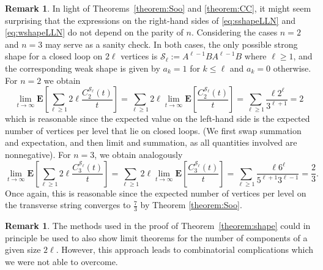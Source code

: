 \documentclass[a4paper,11pt,reqno]{amsart}
\newcommand{\paul}[1]{\todo[color=yellow!70,inline]{Paul: #1}}
\newcommand{\fabian}[1]{\todo[color=red!50,inline]{Fabian: #1}}
\newcommand{\bE}{\mathbf{E}}
\newcommand{\shape}{\mathscr{S}}
\theoremstyle{definition}
\newtheorem{remark}[lemma]{Remark}
\begin{document}
\begin{remark}
 In light of Theorems~\ref{theorem:Soo} and \ref{theorem:CC}, it might seem surprising that the expressions on the right-hand sides of \eqref{eq:sshapeLLN} and \eqref{eq:wshapeLLN} do not depend on the parity of $n$. Considering the cases $n=2$ and $n=3$ may serve as a sanity check. In both cases, the only possible strong shape for a closed loop on $2\ell$ vertices is $\shape_\ell:=A^{\ell-1}BA^{\ell-1}B$ where $\ell\geq 1$, and the corresponding weak shape is given by $a_k=1$ for $k\leq \ell$ and $a_k=0$ otherwise. For $n=2$ we obtain
 \begin{equation*}
  \lim_{t\to\infty} \bE\left[\sum_{\ell\geq1} 2\ell\frac{C_2^{\shape_\ell}(t)}{t} \right]
  = \sum_{\ell\geq1} 2\ell \lim_{t\to\infty} \bE\left[\frac{C_2^{\shape_\ell}(t)}{t} \right] 
  = \sum_{\ell\geq1} \frac{\ell 2^{\ell}}{3^{\ell+1}} = 2
 \end{equation*}
which is reasonable since the expected value on the left-hand side is the expected number of vertices per level that lie on closed loops. (We first swap summation and expectation, and then limit and summation, as all quantities involved are nonnegative). 
 For $n=3$, we obtain analogously
  \begin{equation*}
  \lim_{t\to\infty} \bE\left[\sum_{\ell\geq1} 2\ell\frac{C_3^{\shape_\ell}(t)}{t} \right]
  = \sum_{\ell\geq1} 2\ell \lim_{t\to\infty} \bE\left[\frac{C_3^{\shape_\ell}(t)}{t} \right] 
  = \sum_{\ell\geq1} \frac{\ell 6^\ell}{5^{\ell+1}3^{\ell-1}} = \frac{2}{3}.
 \end{equation*}
 Once again, this is reasonable since the expected number of vertices per level on the transverse string converges to $\frac{7}{3}$ by Theorem \ref{theorem:Soo}. 
\end{remark}

\begin{remark}
 The methods used in the proof of Theorem~\ref{theorem:shape} could in principle be used to also show limit theorems for the number of components of a given size $2\ell$. However, this approach leads to combinatorial complications which we were not able to overcome. 
\end{remark}
\end{document}
